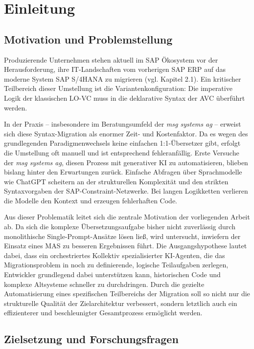 \chapter{Einleitung}
\label{ch:einleitung}

\section{Motivation und Problemstellung}
\label{sec:motivation_und_problemstellung}

Produzierende Unternehmen stehen aktuell im SAP Ökosystem vor der Herausforderung, ihre IT-Landschaften vom vorherigen SAP ERP auf das moderne System SAP S/4HANA zu migrieren (vgl. Kapitel 2.1). Ein kritischer Teilbereich dieser Umstellung ist die Variantenkonfiguration: Die imperative Logik der klassischen \ac{LO-VC} muss in die deklarative Syntax der \ac{AVC} überführt werden. 

In der Praxis – insbesondere im Beratungsumfeld der \textit{msg systems ag} – erweist sich diese Syntax-Migration als enormer Zeit- und Kostenfaktor. Da es wegen des grundlegenden Paradigmenwechsels keine einfachen 1:1-Übersetzer gibt, erfolgt die Umstellung oft manuell und ist entsprechend fehleranfällig. Erste Versuche der \textit{msg systems ag}, diesen Prozess mit generativer \ac{KI} zu automatisieren, blieben bislang hinter den Erwartungen zurück. Einfache Abfragen über Sprachmodelle wie ChatGPT scheitern an der strukturellen Komplexität und den strikten Syntaxvorgaben der SAP-Constraint-Netzwerke. Bei langen Logikketten verlieren die Modelle den Kontext und erzeugen fehlerhaften Code. 

Aus dieser Problematik leitet sich die zentrale Motivation der vorliegenden Arbeit ab. Da sich die komplexe Übersetzungsaufgabe bisher nicht zuverlässig durch monolithische Single-Prompt-Ansätze lösen ließ, wird untersucht, inwiefern der Einsatz eines \ac{MAS} zu besseren Ergebnissen führt. Die Ausgangshypothese lautet dabei, dass ein orchestriertes Kollektiv spezialisierter KI-Agenten, die das Migrationsproblem in noch zu definierende, logische Teilaufgaben zerlegen, Entwickler grundlegend dabei unterstützen kann, historischen Code und komplexe Altsysteme schneller zu durchdringen. Durch die gezielte Automatisierung eines spezifischen Teilbereichs der Migration soll so nicht nur die strukturelle Qualität der Zielarchitektur verbessert, sondern letztlich auch ein effizienterer und beschleunigter Gesamtprozess ermöglicht werden.
\section{Zielsetzung und Forschungsfragen}
\label{sec:zielsetzung_und_forschungsfragen}

